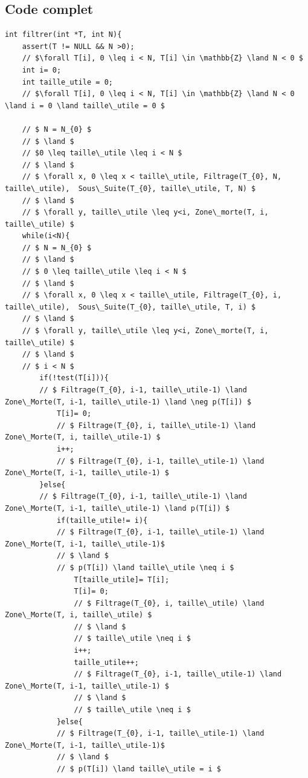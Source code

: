 \documentclass[a4paper, 11pt, oneside]{article}
\begin{document}
\subsection{Code complet}
\begin{lstlisting}
int filtrer(int *T, int N){
    assert(T != NULL && N >0);
    // $\forall T[i], 0 \leq i < N, T[i] \in \mathbb{Z} \land N < 0 $
    int i= 0;
    int taille_utile = 0;
    // $\forall T[i], 0 \leq i < N, T[i] \in \mathbb{Z} \land N < 0 \land i = 0 \land taille\_utile = 0 $ 

    // $ N = N_{0} $
    // $ \land $
    // $0 \leq taille\_utile \leq i < N $
    // $ \land $
    // $ \forall x, 0 \leq x < taille\_utile, Filtrage(T_{0}, N, taille\_utile),  Sous\_Suite(T_{0}, taille\_utile, T, N) $
    // $ \land $
    // $ \forall y, taille\_utile \leq y<i, Zone\_morte(T, i, taille\_utile) $
    while(i<N){
    // $ N = N_{0} $
    // $ \land $
    // $ 0 \leq taille\_utile \leq i < N $
    // $ \land $
    // $ \forall x, 0 \leq x < taille\_utile, Filtrage(T_{0}, i, taille\_utile),  Sous\_Suite(T_{0}, taille\_utile, T, i) $
    // $ \land $
    // $ \forall y, taille\_utile \leq y<i, Zone\_morte(T, i, taille\_utile) $
    // $ \land $
    // $ i < N $
        if(!test(T[i])){
        // $ Filtrage(T_{0}, i-1, taille\_utile-1) \land  Zone\_Morte(T, i-1, taille\_utile-1) \land \neg p(T[i]) $
            T[i]= 0;
            // $ Filtrage(T_{0}, i, taille\_utile-1) \land  Zone\_Morte(T, i, taille\_utile-1) $
            i++;
            // $ Filtrage(T_{0}, i-1, taille\_utile-1) \land  Zone\_Morte(T, i-1, taille\_utile-1) $
        }else{
        // $ Filtrage(T_{0}, i-1, taille\_utile-1) \land  Zone\_Morte(T, i-1, taille\_utile-1) \land p(T[i]) $
            if(taille_utile!= i){
            // $ Filtrage(T_{0}, i-1, taille\_utile-1) \land  Zone\_Morte(T, i-1, taille\_utile-1)$
            // $ \land $
            // $ p(T[i]) \land taille\_utile \neq i $
                T[taille_utile]= T[i];
                T[i]= 0;
                // $ Filtrage(T_{0}, i, taille\_utile) \land  Zone\_Morte(T, i, taille\_utile) $
                // $ \land $
                // $ taille\_utile \neq i $
                i++;
                taille_utile++;
                // $ Filtrage(T_{0}, i-1, taille\_utile-1) \land  Zone\_Morte(T, i-1, taille\_utile-1) $
                // $ \land $
                // $ taille\_utile \neq i $
            }else{
            // $ Filtrage(T_{0}, i-1, taille\_utile-1) \land  Zone\_Morte(T, i-1, taille\_utile-1)$
            // $ \land $
            // $ p(T[i]) \land taille\_utile = i $

\end{lstlisting}
\end{document}
